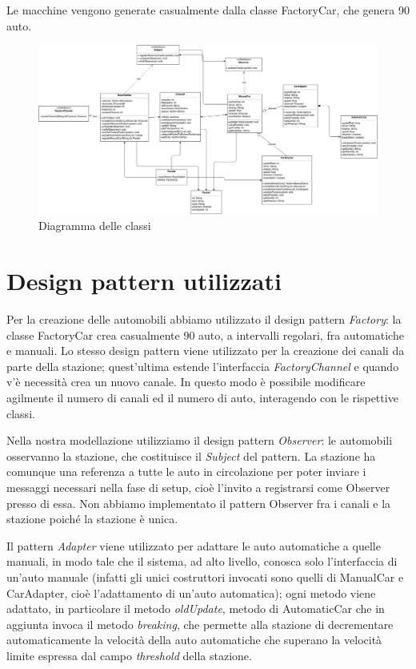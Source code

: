 \documentclass[a4paper,10pt]{article}
\begin{document}
Le macchine vengono generate casualmente dalla classe FactoryCar, che genera 90 auto. 

\begin{figure}[htbp]
\includegraphics[scale=0.24]{class_diagram.jpg}
\caption{Diagramma delle classi}
\label{class_dig}
\end{figure}

\section{Design pattern utilizzati}

Per la creazione delle automobili abbiamo utilizzato il design pattern \textit{Factory}: la classe FactoryCar crea casualmente 90 auto, a intervalli regolari, fra automatiche e manuali. Lo stesso design pattern viene utilizzato per la creazione dei canali da parte della stazione; quest'ultima estende l'interfaccia \textit{FactoryChannel} e quando v'è necessità crea un nuovo canale. In questo modo è possibile modificare agilmente il numero di canali ed il numero di auto, interagendo con le rispettive classi.

Nella nostra modellazione utilizziamo il design pattern \textit{Observer}: le automobili osservanno la stazione, che costituisce il \textit{Subject} del pattern. La stazione ha comunque una referenza a tutte le auto in circolazione per poter inviare i messaggi necessari nella fase di setup, cioè l'invito a registrarsi come Observer presso di essa.  Non abbiamo implementato il pattern Observer fra i canali e la stazione poiché la stazione è unica.

Il pattern \textit{Adapter} viene utilizzato per adattare le auto automatiche a quelle manuali, in modo tale che il sistema, ad alto livello, conosca solo l'interfaccia di un'auto manuale (infatti gli unici costruttori invocati sono quelli di ManualCar e CarAdapter, cioè l'adattamento di un'auto automatica); ogni metodo viene adattato, in particolare il metodo \textit{oldUpdate}, metodo di AutomaticCar che in aggiunta invoca il metodo \textit{breaking}, che permette alla stazione di decrementare automaticamente la velocità della auto automatiche che superano la velocità limite espressa dal campo \textit{threshold} della stazione.
\end{document}
